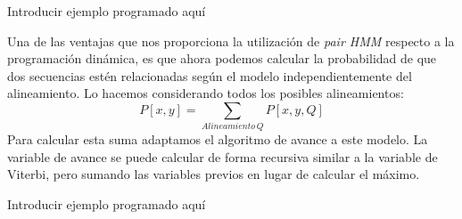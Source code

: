 \begin{exampleth}
    Introducir ejemplo programado aquí
\end{exampleth}

Una de las ventajas que nos proporciona la utilización de \textit{pair HMM} respecto a la programación dinámica, es que ahora podemos calcular la probabilidad de que dos secuencias estén relacionadas según el modelo independientemente del alineamiento. Lo hacemos considerando todos los posibles alineamientos:
\[P[x,y]=\sum_{Alineamiento\, Q}P[x,y,Q]\]
Para calcular esta suma adaptamos el algoritmo de avance a este modelo. La variable de avance se puede calcular de forma recursiva similar a la variable de Viterbi, pero sumando las variables previos en lugar de calcular el máximo.

\begin{exampleth}
    Introducir ejemplo programado aquí
\end{exampleth}